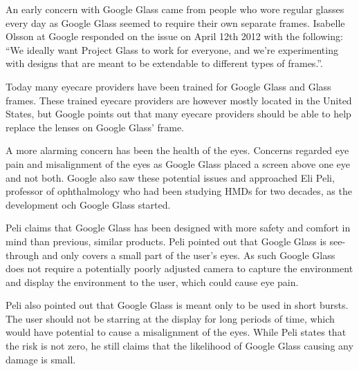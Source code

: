 An early concern with Google Glass came from people who wore regular glasses every day as Google Glass seemed to require their own separate frames. Isabelle Olsson at Google responded on the issue on April 12th 2012 with the following: ``We ideally want Project Glass to work for everyone, and we're experimenting with designs that are meant to be extendable to different types of frames.''.\cite{GoogleGlassFrameResponse}

Today many eyecare providers have been trained for Google Glass and Glass frames. These trained eyecare providers are however mostly located in the United States,\cite{frameProviders} but Google points out that many eyecare providers should be able to help replace the lenses on Google Glass' frame\cite{framesGlass}.

A more alarming concern has been the health of the eyes. \cite{ackerman13} Concerns regarded eye pain and misalignment of the eyes as Google Glass placed a screen above one eye and not both. Google also saw these potential issues and approached Eli Peli, professor of ophthalmology who had been studying HMDs for two decades, as the development och Google Glass started.

Peli claims that Google Glass has been designed with more safety and comfort in mind than previous, similar products. Peli pointed out that Google Glass is see-through and only covers a small part of the user's eyes. As such Google Glass does not require a potentially poorly adjusted camera to capture the environment and display the environment to the user, which could cause eye pain.

Peli also pointed out that Google Glass is meant only to be used in short bursts. The user should not be starring at the display for long periods of time, which would have potential to cause a misalignment of the eyes. While Peli states that the risk is not zero, he still claims that the likelihood of Google Glass causing any damage is small.

